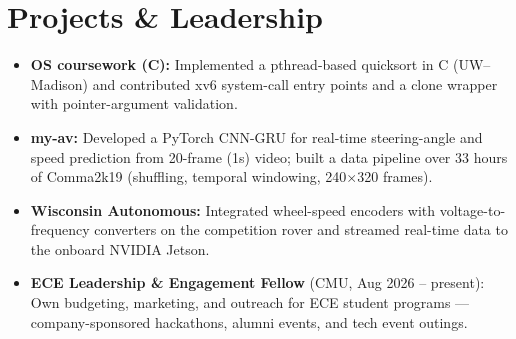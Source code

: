 \documentclass[11pt, letterpaper]{article}
\begin{document}
\section{Projects \& Leadership}
\begin{itemize}
  \item \textbf{OS coursework (C):} Implemented a pthread-based quicksort in C (UW--Madison) and contributed xv6 system-call entry points and a clone wrapper with pointer-argument validation.
  \item \textbf{my-av:} Developed a PyTorch CNN-GRU for real-time steering-angle and speed prediction from 20-frame (1s) video; built a data pipeline over 33 hours of Comma2k19 (shuffling, temporal windowing, 240$\times$320 frames).
  \item \textbf{Wisconsin Autonomous:} Integrated wheel-speed encoders with voltage-to-frequency converters on the competition rover and streamed real-time data to the onboard NVIDIA Jetson.
  \item \textbf{ECE Leadership \& Engagement Fellow} (CMU, Aug 2026 -- present): Own budgeting, marketing, and outreach for ECE student programs --- company-sponsored hackathons, alumni events, and tech event outings.
\end{itemize}
\end{document}
